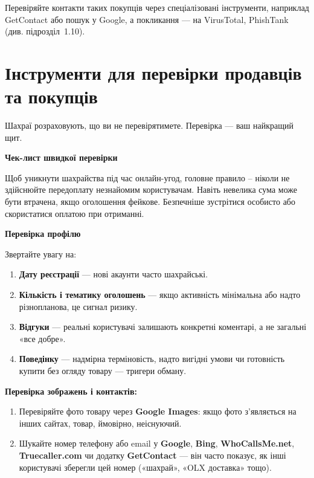 Перевіряйте контакти таких покупців через спеціалізовані інструменти, наприклад GetContact або пошук у Google, а покликання — на VirusTotal, PhishTank (див. підрозділ~1.10).

\chapter{Інструменти для перевірки продавців та покупців}

Шахраї розраховують, що ви не перевірятимете. Перевірка — ваш найкращий щит.

\vspace{0.3cm}
\noindent\textbf{Чек-лист швидкої перевірки}

Щоб уникнути шахрайства під час онлайн-угод, головне правило – ніколи не здійснюйте передоплату незнайомим користувачам. Навіть невелика сума може бути втрачена, якщо оголошення фейкове. Безпечніше зустрітися особисто або скористатися оплатою при отриманні.

\vspace{0.3cm}
\noindent\textbf{Перевірка профілю}

Звертайте увагу на:
\begin{enumerate}
    \item \textbf{Дату реєстрації} — нові акаунти часто шахрайські.
    \item \textbf{Кількість і тематику оголошень} — якщо активність мінімальна або надто різнопланова, це сигнал ризику.
    \item \textbf{Відгуки} — реальні користувачі залишають конкретні коментарі, а не загальні «все добре».
    \item \textbf{Поведінку} — надмірна терміновість, надто вигідні умови чи готовність купити без огляду товару —  тригери обману.
\end{enumerate}

\newpage

\noindent\textbf{Перевірка зображень і контактів:}

\begin{enumerate}
    \item Перевіряйте фото товару через \textbf{Google Images}: якщо фото з’являється на інших сайтах, товар, ймовірно, неіснуючий.
    \item Шукайте номер телефону або email у \textbf{Google}, \textbf{Bing}, \textbf{WhoCallsMe.net}, \textbf{Truecaller.com} чи додатку \textbf{GetContact} — він часто показує, як інші користувачі зберегли цей номер («шахрай», «OLX доставка» тощо).
\end{enumerate}


